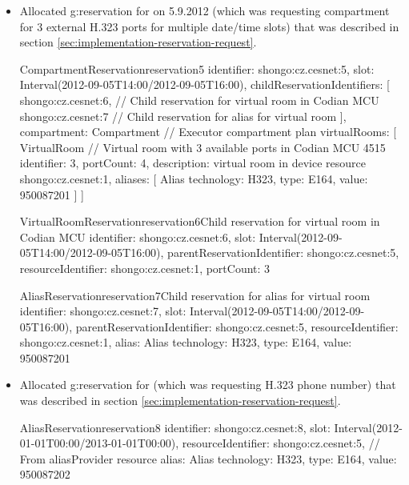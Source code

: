 \begin{itemize}
\item Allocated \gls{g:reservation} for \hyperref[oc:request2]{} on 5.9.2012 (which was requesting compartment for 3 external H.323 ports for multiple date/time slots) that was described in section \ref{sec:implementation-reservation-request}.
\begin{ObjectCode}{CompartmentReservation}{reservation5}{}
identifier: shongo:cz.cesnet:5,
slot: Interval(2012-09-05T14:00/2012-09-05T16:00),
childReservationIdentifiers: [
  shongo:cz.cesnet:6, // Child reservation for virtual room in Codian MCU
  shongo:cz.cesnet:7  // Child reservation for alias for virtual room
],
compartment: Compartment { // Executor compartment plan  
  virtualRooms: [
    VirtualRoom { // Virtual room with 3 available ports in Codian MCU 4515
      identifier: 3,
      portCount: 4,
      description: virtual room in device resource shongo:cz.cesnet:1,      
      aliases: [
        Alias { technology: H323, type: E164, value: 950087201 }
      ]
    }
  ]
}
\end{ObjectCode}
\begin{ObjectCode}{VirtualRoomReservation}{reservation6}{Child reservation for virtual room in Codian MCU}
identifier: shongo:cz.cesnet:6,
slot: Interval(2012-09-05T14:00/2012-09-05T16:00),
parentReservationIdentifier: shongo:cz.cesnet:5,
resourceIdentifier: shongo:cz.cesnet:1,
portCount: 3
\end{ObjectCode}
\begin{ObjectCode}{AliasReservation}{reservation7}{Child reservation for alias for virtual room}
identifier: shongo:cz.cesnet:7,
slot: Interval(2012-09-05T14:00/2012-09-05T16:00),
parentReservationIdentifier: shongo:cz.cesnet:5,
resourceIdentifier: shongo:cz.cesnet:1,
alias: Alias { technology: H323, type: E164, value: 950087201 }
\end{ObjectCode}

\item Allocated \gls{g:reservation} for \hyperref[oc:request3]{} (which was requesting H.323 phone number) that was described in section \ref{sec:implementation-reservation-request}.
\begin{ObjectCode}{AliasReservation}{reservation8}{}
identifier: shongo:cz.cesnet:8,
slot: Interval(2012-01-01T00:00/2013-01-01T00:00),
resourceIdentifier: shongo:cz.cesnet:5, // From aliasProvider resource
alias: Alias { 
  technology: H323, 
  type: E164, 
  value: 950087202 
}
\end{ObjectCode}

\end{itemize}

